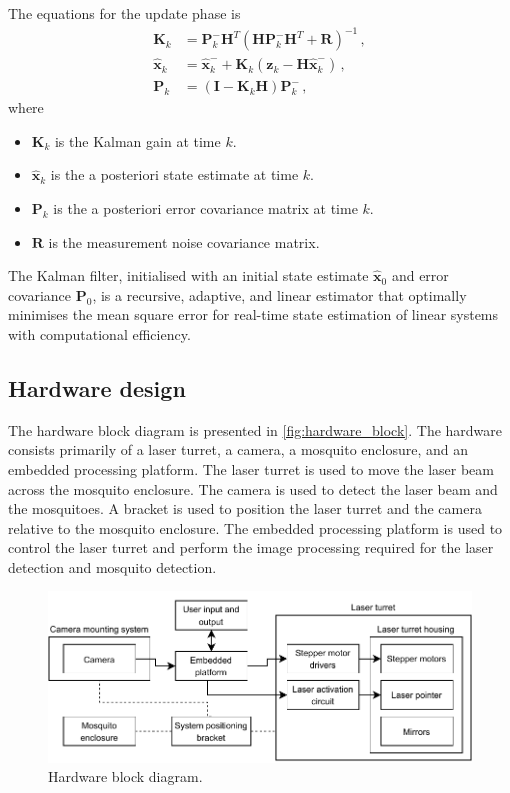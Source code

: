 The equations for the update phase is
\begin{equation}
  \begin{aligned}
    \mathbf{K}_k       & = \mathbf{P}_k^-\mathbf{H}^T(\mathbf{HP}_k^-\mathbf{H}^T + \mathbf{R})^{-1}\,,          \\
    \hat{\mathbf{x}}_k & = \hat{\mathbf{x}}_k^- + \mathbf{K}_k(\mathbf{z}_k - \mathbf{H}\hat{\mathbf{x}}_k^-)\,, \\
    \mathbf{P}_k       & = (\mathbf{I} - \mathbf{K}_k\mathbf{H})\mathbf{P}_k^-\,,
  \end{aligned}
  \label{eq:kalman_filter_update}
\end{equation}
where
\begin{itemize}
  \item $\mathbf{K}_k$ is the Kalman gain at time $k$.
  \item $\hat{\mathbf{x}}_k$ is the a posteriori state estimate at time $k$.
  \item $\mathbf{P}_k$ is the a posteriori error covariance matrix at time $k$.
  \item $\mathbf{R}$ is the measurement noise covariance matrix.
\end{itemize}

The Kalman filter, initialised with an initial state estimate $\hat{\mathbf{x}}_0$ and error covariance $\mathbf{P}_0$, is a recursive, adaptive, and linear estimator that optimally minimises the mean square error for real-time state estimation of linear systems with computational efficiency.

\FloatBarrier
\subsection{Hardware design}\label{subsec:hardware_design}
The hardware block diagram is presented in \autoref{fig:hardware_block}. The hardware consists primarily of a laser turret, a camera, a mosquito enclosure, and an embedded processing platform. The laser turret is used to move the laser beam across the mosquito enclosure. The camera is used to detect the laser beam and the mosquitoes. A bracket is used to position the laser turret and the camera relative to the mosquito enclosure. The embedded processing platform is used to control the laser turret and perform the image processing required for the laser detection and mosquito detection.
\begin{figure}[h]
  \centering
  \includegraphics[width=\textwidth]{figures/hardware_block_diagram.pdf}
  \caption{Hardware block diagram.}
  \label{fig:hardware_block}
\end{figure}



